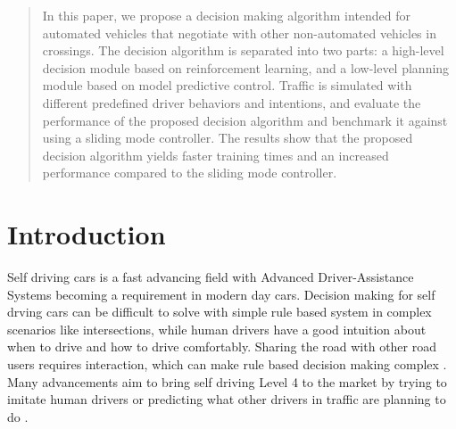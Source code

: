 \newcommand {\matr}[2]{\left[\begin{array}{#1}#2\end{array}\right]}
\newcommand{\E}{\mathbb{E}}
\newcommand{\tr}{\mathrm{tr}}
\newcommand{\x}{{\mathbf{x}}}
\renewcommand{\u}{{\mathbf{u}}}
\newcommand{\w}{{\mathbf{w}}}
\renewcommand{\r}{{\mathbf{r}}}


\begin{abstract}
	In this paper, we propose a decision making algorithm intended for automated vehicles that negotiate with other non-automated vehicles in crossings. The decision algorithm is separated into two parts: a high-level decision module based on reinforcement learning, and a low-level planning module based on model predictive control. Traffic is simulated with different predefined driver behaviors and intentions, and evaluate the performance of the proposed decision algorithm and benchmark it against using a sliding mode controller. The results show that the proposed decision algorithm yields faster training times and an increased performance compared to the sliding mode controller. 
\end{abstract}


\section{Introduction}

Self driving cars is a fast advancing field with Advanced Driver-Assistance Systems becoming a requirement in modern day cars. Decision making for self drving cars can be difficult to solve with simple rule based system in complex scenarios like intersections, while human drivers have a good intuition about when to drive and how to drive comfortably. Sharing the road with other road users requires interaction, which can make rule based decision making complex \cite{Liebner2012DriverModel}.
Many advancements aim to bring self driving Level 4 to the market by trying to imitate human drivers \cite{Bansal2018ChauffeurNet:Worst} or predicting what other drivers in traffic are planning to do \cite{Zyner2017LongPrediction}.

